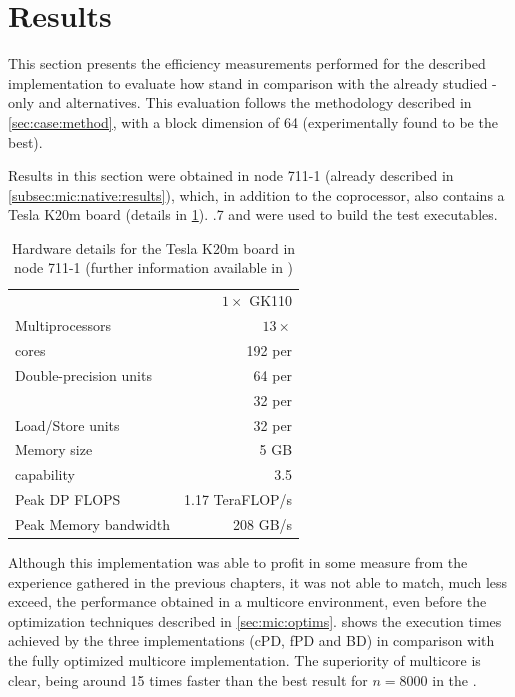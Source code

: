 \documentclass[../thesis]{subfiles}
\begin{document}
	\section{Results}
	\label{sec:cuda:results}

	This section presents the efficiency measurements performed for the described \cuda implementation to evaluate how \gpus stand in comparison with the already studied \cpu-only and \intel\xeonphi alternatives. This evaluation follows the methodology described in \cref{sec:case:method}, with a block dimension of 64 (experimentally found to be the best).

	Results in this section were obtained in \search node 711-1 (already described in \cref{subsec:mic:native:results}), which, in addition to the \intel\xeonphi coprocessor, also contains a \nvidia Tesla K20m board (details in \cref{tab:k20m}). .7 and  were used to build the test executables.

	\begin{table}
		\centering
		\begin{tabular}{lr}
			\hline
			\gpus & $1\times$ GK110 \\
			Multiprocessors & $13\times$ \smx \\
			\cuda cores & 192 per \smx \\
			Double-precision units & 64 per \smx \\
			\sfus & 32 per \smx \\
			Load/Store units & 32 per \smx \\
			Memory size & 5 GB \\
			\cuda capability & 3.5 \\
			\hline
			Peak DP FLOPS & 1.17 TeraFLOP/s \\
			Peak Memory bandwidth & 208 GB/s \\
			\hline
		\end{tabular}
		\caption[Hardware details for the \nvidia Tesla K20m board in \search node 711-1]{Hardware details for the \nvidia Tesla K20m board in \search node 711-1 (further information available in \cite{NVIDIA:KEPLER,NVIDIA:TeslaKSeriesOverview})}
		\label{tab:k20m}
	\end{table}

	Although this implementation was able to profit in some measure from the experience gathered in the previous chapters, it was not able to match, much less exceed, the performance obtained in a multicore environment, even before the optimization techniques described in \cref{sec:mic:optims}.  shows the execution times achieved by the three \cuda implementations (cPD, fPD and BD) in comparison with the fully optimized multicore implementation. The superiority of multicore is clear, being around 15 times faster than the best result for $n=8000$ in the \gpu.
\end{document}

